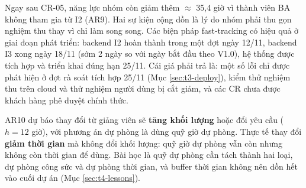 
Ngay sau CR-05, năng lực nhóm còn giảm thêm $\approx$ 35,4 giờ vì thành viên BA không tham gia từ I2 (AR9). Hai sự kiện cộng dồn là lý do nhóm phải thu gọn nghiệm thu thay vì chỉ làm song song. Các biện pháp fast-tracking có hiệu quả ở giai đoạn phát triển: backend I2 hoàn thành trong một đợt ngày 12/11, backend I3 xong ngày 18/11 (sớm 2 ngày so với ngày bắt đầu theo V1.0), hệ thống được tích hợp và triển khai đúng hạn 25/11. Cái giá phải trả là: một số lỗi chỉ được phát hiện ở đợt rà soát tích hợp 25/11 (Mục \ref{sec:t3-deploy}), kiểm thử nghiệm thu trên cloud và thử nghiệm người dùng bị cắt giảm, và các CR chưa được khách hàng phê duyệt chính thức.


AR10 dự báo thay đổi từ giảng viên sẽ \textbf{tăng khối lượng} hoặc đổi yêu cầu ($h = 12$ giờ), với phương án dự phòng là dùng quỹ giờ dự phòng. Thực tế thay đổi \textbf{giảm thời gian} mà không đổi khối lượng: quỹ giờ dự phòng vẫn còn nhưng không còn thời gian để dùng. Bài học là quỹ dự phòng cần tách thành hai loại, dự phòng công sức và dự phòng thời gian, và buffer thời gian không nên dồn hết vào cuối dự án (Mục \ref{sec:t4-lessons}).

